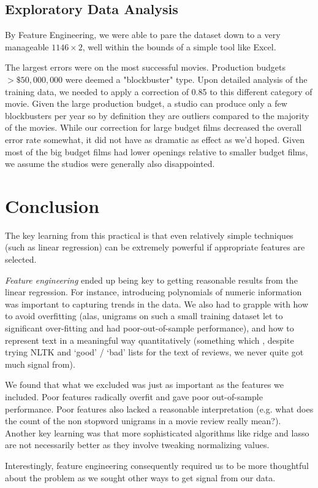 \documentclass[11pt, oneside]{article}   	%
\begin{document}
\subsection*{Exploratory Data Analysis}

By Feature Engineering, we were able to pare the dataset down to a very manageable $1146 \times 2$, well within the bounds of a simple tool like Excel.

The largest errors were on the most successful movies. Production budgets $> \$50,000,000$ were deemed a "blockbuster" type. Upon detailed analysis of the training data, we needed to apply a correction of 0.85 to this different category of movie. Given the large production budget, a studio can produce only a few blockbusters per year so by definition they are outliers compared to the majority of the movies. While our correction for large budget films decreased the overall error rate somewhat, it did not have as dramatic as effect as we'd hoped. Given most of the big budget films had lower openings relative to smaller budget films, we assume the studios were generally also disappointed.

\section*{Conclusion}
The key learning from this practical is that even relatively simple techniques (such as linear regression) can be extremely powerful if appropriate features are selected. 

\emph{Feature engineering} ended up being key to getting reasonable results from the linear regression. For instance, introducing polynomials of numeric information was important to capturing trends in the data. We also had to grapple with how to avoid overfitting (alas, unigrams on such a small training dataset let to significant over-fitting and had poor-out-of-sample performance), and how to represent text in a meaningful way quantitatively (something which , despite trying NLTK and `good' / `bad' lists for the text of reviews, we never quite got much signal from).

We found that what we excluded was just as important as the features we included. Poor features radically overfit and gave poor out-of-sample performance. Poor features also lacked a reasonable interpretation (e.g. what does the count of the non stopword unigrams in a movie review really mean?). Another key learning was that more sophisticated algorithms like ridge and lasso are not necessarily better as they involve tweaking normalizing values.

Interestingly, feature engineering consequently required us to be more thoughtful about the problem as we sought other ways to get signal from our data. 
\end{document}
